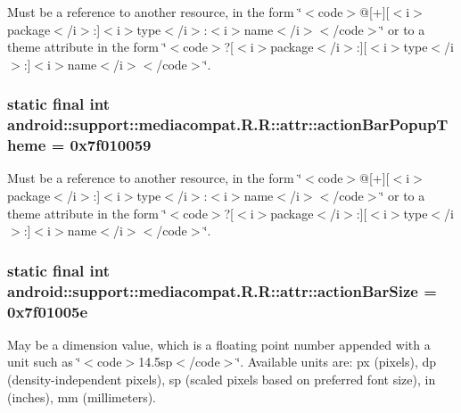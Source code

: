 Must be a reference to another resource, in the form \char`\"{}$<$code$>$@\mbox{[}+\mbox{]}\mbox{[}$<$i$>$package$<$/i$>$:\mbox{]}$<$i$>$type$<$/i$>$:$<$i$>$name$<$/i$>$$<$/code$>$\char`\"{} or to a theme attribute in the form \char`\"{}$<$code$>$?\mbox{[}$<$i$>$package$<$/i$>$:\mbox{]}\mbox{[}$<$i$>$type$<$/i$>$:\mbox{]}$<$i$>$name$<$/i$>$$<$/code$>$\char`\"{}. \hypertarget{classandroid_1_1support_1_1mediacompat_1_1_r_1_1attr_f52c50a497dfc513c61c785996dae864}{
\subsubsection[{actionBarPopupTheme}]{\setlength{\rightskip}{0pt plus 5cm}static final int android::support::mediacompat.R.R::attr::actionBarPopupTheme = 0x7f010059}}
\label{classandroid_1_1support_1_1mediacompat_1_1_r_1_1attr_f52c50a497dfc513c61c785996dae864}


Must be a reference to another resource, in the form \char`\"{}$<$code$>$@\mbox{[}+\mbox{]}\mbox{[}$<$i$>$package$<$/i$>$:\mbox{]}$<$i$>$type$<$/i$>$:$<$i$>$name$<$/i$>$$<$/code$>$\char`\"{} or to a theme attribute in the form \char`\"{}$<$code$>$?\mbox{[}$<$i$>$package$<$/i$>$:\mbox{]}\mbox{[}$<$i$>$type$<$/i$>$:\mbox{]}$<$i$>$name$<$/i$>$$<$/code$>$\char`\"{}. \hypertarget{classandroid_1_1support_1_1mediacompat_1_1_r_1_1attr_54e10d224a62341c8d60248128800347}{
\subsubsection[{actionBarSize}]{\setlength{\rightskip}{0pt plus 5cm}static final int android::support::mediacompat.R.R::attr::actionBarSize = 0x7f01005e}}
\label{classandroid_1_1support_1_1mediacompat_1_1_r_1_1attr_54e10d224a62341c8d60248128800347}


May be a dimension value, which is a floating point number appended with a unit such as \char`\"{}$<$code$>$14.5sp$<$/code$>$\char`\"{}. Available units are: px (pixels), dp (density-independent pixels), sp (scaled pixels based on preferred font size), in (inches), mm (millimeters). 

